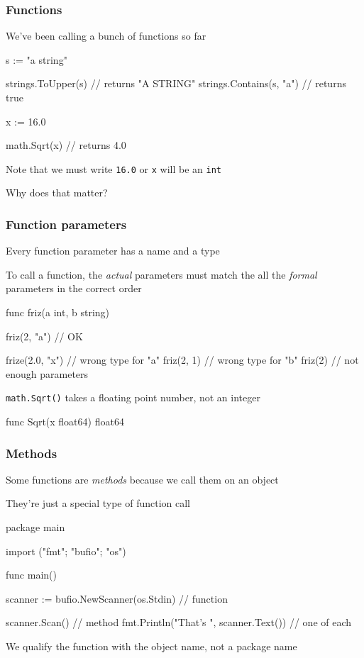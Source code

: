 \documentclass[handout,compress,t,11pt]{beamer}
\begin{document}
\begin{frame}[fragile]
    \frametitle{Functions}
    We've been calling a bunch of functions so far \par
    \vspace{0.5\baselineskip}
\begin{golang}
s := "a string"

strings.ToUpper(s)         // returns "A STRING"
strings.Contains(s, "a")   // returns true

x := 16.0

math.Sqrt(x)               // returns 4.0
\end{golang}
    \vspace{0.5\baselineskip}
Note that we must write \verb|16.0| or \verb|x| will be an \verb|int| \par
    \vspace{2\baselineskip}
Why does that matter?
\end{frame}

\begin{frame}[fragile]
    \frametitle{Function parameters}
    Every function parameter has a name and a type \par
    \vspace{0.5\baselineskip}
    To call a function, the {\em actual} parameters must match the
    all the {\em formal} parameters in the correct order
\begin{golang}
func friz(a int, b string)

friz(2, "a")               // OK

frize(2.0, "x")            // wrong type for "a"
friz(2, 1)                 // wrong type for "b"
friz(2)                    // not enough parameters
\end{golang}
    \vspace{\baselineskip}
\verb|math.Sqrt()| takes a floating point number, not an integer
\begin{golang}
func Sqrt(x float64) float64
\end{golang}
\end{frame}

\begin{frame}[fragile]
    \frametitle{Methods}
    Some functions are {\em methods} because we call them on an object \par
    \vspace{0.5\baselineskip}
    They're just a special type of function call
\begin{golang}
package main

import ("fmt"; "bufio"; "os")

func main() {
    scanner := bufio.NewScanner(os.Stdin)    // function

    scanner.Scan()                           // method
    fmt.Println("That's ", scanner.Text())   // one of each
}
\end{golang}
    \vspace{\baselineskip}
We qualify the function with the object name, not a package name
\end{frame}
\end{document}
